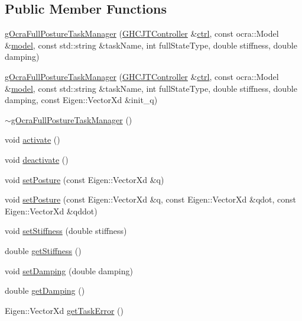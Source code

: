 \subsection*{Public Member Functions}
\begin{DoxyCompactItemize}
\item 
\hyperlink{classgocra_1_1gOcraFullPostureTaskManager_a71c039da046e968235f40e53838018c0}{g\+Ocra\+Full\+Posture\+Task\+Manager} (\hyperlink{classgocra_1_1GHCJTController}{G\+H\+C\+J\+T\+Controller} \&\hyperlink{classgocra_1_1gOcraTaskManagerBase_a52d76d9b54d92f3d31faeaafda99e4c7}{ctrl}, const ocra\+::\+Model \&\hyperlink{classgocra_1_1gOcraTaskManagerBase_adc439e7170f7120611fc6d009d06404e}{model}, const std\+::string \&task\+Name, int full\+State\+Type, double stiffness, double damping)
\item 
\hyperlink{classgocra_1_1gOcraFullPostureTaskManager_a29b20652dfa8665e85cf88a75b1e681f}{g\+Ocra\+Full\+Posture\+Task\+Manager} (\hyperlink{classgocra_1_1GHCJTController}{G\+H\+C\+J\+T\+Controller} \&\hyperlink{classgocra_1_1gOcraTaskManagerBase_a52d76d9b54d92f3d31faeaafda99e4c7}{ctrl}, const ocra\+::\+Model \&\hyperlink{classgocra_1_1gOcraTaskManagerBase_adc439e7170f7120611fc6d009d06404e}{model}, const std\+::string \&task\+Name, int full\+State\+Type, double stiffness, double damping, const Eigen\+::\+Vector\+Xd \&init\+\_\+q)
\item 
\hyperlink{classgocra_1_1gOcraFullPostureTaskManager_a20b181dde0293c33ed654036e9dcdbc0}{$\sim$g\+Ocra\+Full\+Posture\+Task\+Manager} ()
\item 
void \hyperlink{classgocra_1_1gOcraFullPostureTaskManager_a24c2b63ff065c8d7b056ccadddf55b59}{activate} ()
\item 
void \hyperlink{classgocra_1_1gOcraFullPostureTaskManager_aa53994ddf44ba5d9768ea3d3e5ba9931}{deactivate} ()
\item 
void \hyperlink{classgocra_1_1gOcraFullPostureTaskManager_a80bcb1334e7a9bb8604c8b091e32933d}{set\+Posture} (const Eigen\+::\+Vector\+Xd \&q)
\item 
void \hyperlink{classgocra_1_1gOcraFullPostureTaskManager_a86952f16b120b50f85fa75ce3ccd4ad0}{set\+Posture} (const Eigen\+::\+Vector\+Xd \&q, const Eigen\+::\+Vector\+Xd \&qdot, const Eigen\+::\+Vector\+Xd \&qddot)
\item 
void \hyperlink{classgocra_1_1gOcraFullPostureTaskManager_a30df8f38f4084c0404337f168ad741dc}{set\+Stiffness} (double stiffness)
\item 
double \hyperlink{classgocra_1_1gOcraFullPostureTaskManager_a34270c93e3c25b35c54e618d5af964d0}{get\+Stiffness} ()
\item 
void \hyperlink{classgocra_1_1gOcraFullPostureTaskManager_a0080d88c68d85320d0f0f68baf0260ad}{set\+Damping} (double damping)
\item 
double \hyperlink{classgocra_1_1gOcraFullPostureTaskManager_a946558f7ec0b0c58cbb3b83d19c4aad1}{get\+Damping} ()
\item 
Eigen\+::\+Vector\+Xd \hyperlink{classgocra_1_1gOcraFullPostureTaskManager_a8be4aac1fe7ec4f68e31f72a8aab6af8}{get\+Task\+Error} ()
\end{DoxyCompactItemize}
